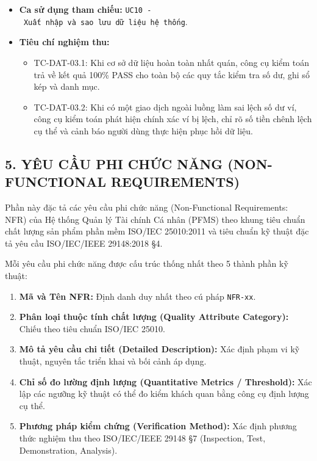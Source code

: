 \documentclass[11pt,a4paper]{article}
\providecommand{\tightlist}{
  \setlength{\itemsep}{0pt}\setlength{\parskip}{0pt}}
\begin{document}
\begin{itemize}
  \begin{itemize}
  \tightlist
  \item
    Báo cáo kiểm toán toàn vẹn dữ liệu (Data Integrity Audit Report)
    hiển thị trạng thái của từng quy tắc kiểm tra (ĐẠT / KHÔNG ĐẠT).
  \item
    Danh sách chi tiết các sai lệch hoặc bất thường phát hiện được kèm
    hướng dẫn khắc phục.
  \end{itemize}
\item
  \textbf{Ca sử dụng tham chiếu:}
  \texttt{UC10\ -\ Xuất\ nhập\ và\ sao\ lưu\ dữ\ liệu\ hệ\ thống}.
\item
  \textbf{Tiêu chí nghiệm thu:}

  \begin{itemize}
  \tightlist
  \item
    TC-DAT-03.1: Khi cơ sở dữ liệu hoàn toàn nhất quán, công cụ kiểm
    toán trả về kết quả 100\% PASS cho toàn bộ các quy tắc kiểm tra số
    dư, ghi sổ kép và danh mục.
  \item
    TC-DAT-03.2: Khi có một giao dịch ngoài luồng làm sai lệch số dư ví,
    công cụ kiểm toán phát hiện chính xác ví bị lệch, chỉ rõ số tiền
    chênh lệch cụ thể và cảnh báo người dùng thực hiện phục hồi dữ liệu.
  \end{itemize}
\end{itemize}

\clearpage
\subsection{5. YÊU CẦU PHI CHỨC NĂNG (NON-FUNCTIONAL
REQUIREMENTS)}\label{5-yuxeau-cux1ea7u-phi-chux1ee9c-nux103ng-non-functional-requirements}

Phần này đặc tả các yêu cầu phi chức năng (Non-Functional Requirements:
NFR) của Hệ thống Quản lý Tài chính Cá nhân (PFMS) theo khung tiêu chuẩn
chất lượng sản phẩm phần mềm ISO/IEC 25010:2011 và tiêu chuẩn kỹ thuật
đặc tả yêu cầu ISO/IEC/IEEE 29148:2018 §4.

Mỗi yêu cầu phi chức năng được cấu trúc thống nhất theo 5 thành phần kỹ
thuật:

\begin{enumerate}
\def\labelenumi{\arabic{enumi}.}
\tightlist
\item
  \textbf{Mã và Tên NFR:} Định danh duy nhất theo cú pháp
  \texttt{NFR-xx}.
\item
  \textbf{Phân loại thuộc tính chất lượng (Quality Attribute Category):}
  Chiếu theo tiêu chuẩn ISO/IEC 25010.
\item
  \textbf{Mô tả yêu cầu chi tiết (Detailed Description):} Xác định phạm
  vi kỹ thuật, nguyên tắc triển khai và bối cảnh áp dụng.
\item
  \textbf{Chỉ số đo lường định lượng (Quantitative Metrics /
  Threshold):} Xác lập các ngưỡng kỹ thuật có thể đo kiểm khách quan
  bằng công cụ định lượng cụ thể.
\item
  \textbf{Phương pháp kiểm chứng (Verification Method):} Xác định phương
  thức nghiệm thu theo ISO/IEC/IEEE 29148 §7 (Inspection, Test,
  Demonstration, Analysis).
\end{enumerate}
\end{document}
